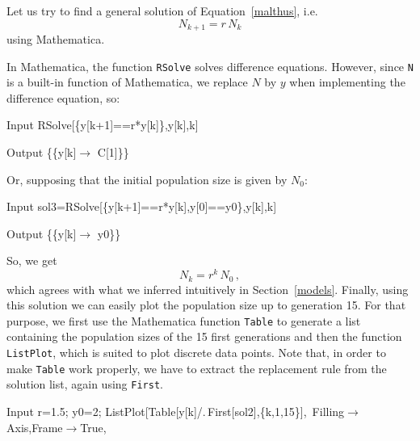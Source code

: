 \begin{example}
\ifmathematica
Let us try to find a general solution of Equation~\eqref{malthus}, i.e.
$$
N_{k+1}=r\,N_k
$$
using Mathematica.

In Mathematica, the function \lstinline{RSolve} solves difference equations. However, since \lstinline{N} is a built-in function of Mathematica, we replace $N$ by $y$ when implementing the difference equation, so:
\begin{mdframed}[default,backgroundcolor=gray!40,roundcorner=8pt]
\begin{mmaCell}{Input}
  RSolve[\{y[k+1]==r*y[k]\},y[k],k]
\end{mmaCell}

\begin{mmaCell}{Output}
  \{\{y[k]\(\to\) C[1]\}\}
\end{mmaCell}
\end{mdframed}
Or, supposing that the initial population size is given by $N_0$:
\begin{mdframed}[default,backgroundcolor=gray!40,roundcorner=8pt]
\begin{mmaCell}{Input}
  sol3=RSolve[\{y[k+1]==r*y[k],y[0]==y0\},y[k],k]
\end{mmaCell}


\begin{mmaCell}{Output}
  \{\{y[k]\(\to\) y0\}\}
\end{mmaCell}
\end{mdframed}
So, we get
$$
N_k=r^k\,N_0\,,
$$
which agrees with what we inferred intuitively in Section~\ref{models}. Finally, using this solution we can easily plot the population size up to generation 15. For that purpose, we first use the Mathematica function \lstinline{Table} to generate a list containing the population sizes of the 15 first generations and then the function \lstinline{ListPlot}, which is suited to plot discrete data points. Note that, in order to make \lstinline{Table} work properly, we have to extract the replacement rule from the solution list, again using \lstinline{First}.

\begin{mdframed}[default,backgroundcolor=gray!40,roundcorner=8pt]
\begin{mmaCell}[moredefined={sol2,Filling},morefunctionlocal={k}]{Input}
  r=1.5;
	 y0=2;
	 ListPlot[Table[y[k]/.\(\pmb{\,}\)First[sol2],\{k,1,15\}],\
Filling\(\pmb{\to}\)Axis,Frame\(\pmb{\to}\)True,


\end{mmaCell}
\end{mdframed}
\end{example}
